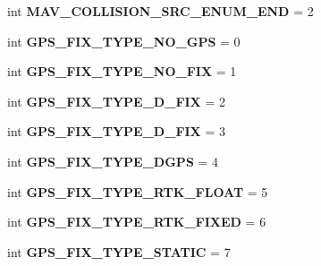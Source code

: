 \begin{DoxyCompactItemize}
int {\bfseries M\+A\+V\+\_\+\+C\+O\+L\+L\+I\+S\+I\+O\+N\+\_\+\+S\+R\+C\+\_\+\+E\+N\+U\+M\+\_\+\+E\+ND} = 2
\item 
\mbox{\label{namespacepymavlink_1_1dialects_1_1v10_a4151b789512d93f5f200ac70d7b9b4ef}} 
int {\bfseries G\+P\+S\+\_\+\+F\+I\+X\+\_\+\+T\+Y\+P\+E\+\_\+\+N\+O\+\_\+\+G\+PS} = 0
\item 
\mbox{\label{namespacepymavlink_1_1dialects_1_1v10_ab2d4f8e5d6dc5f48f18d1a2eef1c2a33}} 
int {\bfseries G\+P\+S\+\_\+\+F\+I\+X\+\_\+\+T\+Y\+P\+E\+\_\+\+N\+O\+\_\+\+F\+IX} = 1
\item 
\mbox{\label{namespacepymavlink_1_1dialects_1_1v10_ad6925caf70661110828035375cd9d4e9}} 
int {\bfseries G\+P\+S\+\_\+\+F\+I\+X\+\_\+\+T\+Y\+P\+E\+\_\+D\+\_\+\+F\+IX} = 2
\item 
\mbox{\label{namespacepymavlink_1_1dialects_1_1v10_a7acb219a117bcfb0d79d00457f2c9f48}} 
int {\bfseries G\+P\+S\+\_\+\+F\+I\+X\+\_\+\+T\+Y\+P\+E\+\_\+D\+\_\+\+F\+IX} = 3
\item 
\mbox{\label{namespacepymavlink_1_1dialects_1_1v10_a4e98a9bf7382b0ac31ec46c6af621ef8}} 
int {\bfseries G\+P\+S\+\_\+\+F\+I\+X\+\_\+\+T\+Y\+P\+E\+\_\+\+D\+G\+PS} = 4
\item 
\mbox{\label{namespacepymavlink_1_1dialects_1_1v10_af411c79a6e1562db5619ad54e67b3126}} 
int {\bfseries G\+P\+S\+\_\+\+F\+I\+X\+\_\+\+T\+Y\+P\+E\+\_\+\+R\+T\+K\+\_\+\+F\+L\+O\+AT} = 5
\item 
\mbox{\label{namespacepymavlink_1_1dialects_1_1v10_ae6012e987cc9eca24346164bb99948e5}} 
int {\bfseries G\+P\+S\+\_\+\+F\+I\+X\+\_\+\+T\+Y\+P\+E\+\_\+\+R\+T\+K\+\_\+\+F\+I\+X\+ED} = 6
\item 
\mbox{\label{namespacepymavlink_1_1dialects_1_1v10_ae188ef4a9a354413709f7014a9e85868}} 
int {\bfseries G\+P\+S\+\_\+\+F\+I\+X\+\_\+\+T\+Y\+P\+E\+\_\+\+S\+T\+A\+T\+IC} = 7
\item 

\end{DoxyCompactItemize}
